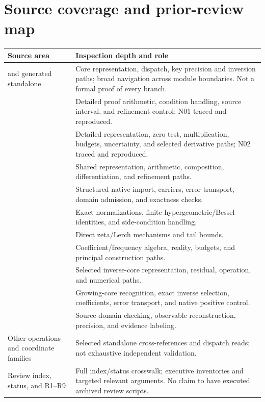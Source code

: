\documentclass[11pt,a4paper]{article}
\begin{document}
\appendix
\section{Source coverage and prior-review map}
\label{app:coverage}
\begin{longtable}{@{}P{0.46\textwidth}P{0.46\textwidth}@{}}
\toprule Source area & Inspection depth and role\\\midrule\endhead
{} and generated standalone & Core representation, dispatch, key precision and inversion paths; broad navigation across module boundaries. Not a formal proof of every branch.\\
 & Detailed proof arithmetic, condition handling, source interval, and refinement control; N01 traced and reproduced.\\
 & Detailed representation, zero test, multiplication, budgets, uncertainty, and selected derivative paths; N02 traced and reproduced.\\
 & Shared representation, arithmetic, composition, differentiation, and refinement paths.\\
 & Structured native import, carriers, error transport, domain admission, and exactness checks.\\
 & Exact normalizations, finite hypergeometric/Bessel identities, and side-condition handling.\\
 & Direct zeta/Lerch mechanisms and tail bounds.\\
 & Coefficient/frequency algebra, reality, budgets, and principal construction paths.\\
 & Selected inverse-core representation, residual, operation, and numerical paths.\\
 & Growing-core recognition, exact inverse selection, coefficients, error transport, and native positive control.\\
 & Source-domain checking, observable reconstruction, precision, and evidence labeling.\\
Other operations and coordinate families & Selected standalone cross-references and dispatch reads; not exhaustive independent validation.\\
Review index, status, and R1--R9 & Full index/status crosswalk; executive inventories and targeted relevant arguments. No claim to have executed archived review scripts.\\
\bottomrule
\end{longtable}
\end{document}
